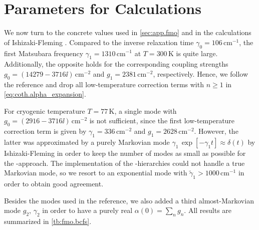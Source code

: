 \section{Parameters for Calculations}
\label{sec:tla.parameters}

We now turn to the concrete values used in \autoref{sec:app.fmo} and in the calculations of Ishizaki-Fleming \cite{IsFl09_fmo}.
Compared to the inverse relaxation time $\gamma_0 = 106\,\mathrm{cm^{-1}}$, the first Matsubara frequency $\gamma_1 = 1310\,\mathrm{cm^{-1}}$ at $T = 300\,\mathrm{K}$ is quite large.
Additionally, the opposite holds for the corresponding coupling strengths $g_0 = (14279 - 3716\ii)\,\mathrm{cm^{-2}}$ and $g_1 = 2381\,\mathrm{cm^{-2}}$, respectively.
Hence, we follow the reference and drop all low-temperature correction terms with $n \ge 1$ in \autoref{eq:coth.alpha_expansion}.

For cryogenic temperature $T = 77\,\mathrm{K}$, a single mode with $g_0 = (2916 - 3716\ii)\,\mathrm{cm^{-2}}$ is not sufficient, since the first low-temperature correction term is given by $\gamma_1 = 336\,\mathrm{cm^{-2}}$ and $g_1 = 2628\,\mathrm{cm^{-2}}$.
However, the latter was approximated by a purely Markovian mode $\gamma_1\,\exp[-\gamma_1 t] \approx \delta(t)$ by Ishizaki-Fleming in order to keep the number of modes as small as possible for the \HEOM-approach.
The implementation of the \NMSSE-hierarchies could not handle a true Markovian mode, so we resort to an exponential mode with $\tilde\gamma_1 > 1000\,\mathrm{cm^{-1}}$ in order to obtain good agreement.

Besides the modes used in the reference, we also added a third almost-Markovian mode $g_2$, $\gamma_2$ in order to have a purely real $\alpha(0) = \sum_n g_n$.
All results are summarized in \autoref{tb:fmo.bcfs}.\\


